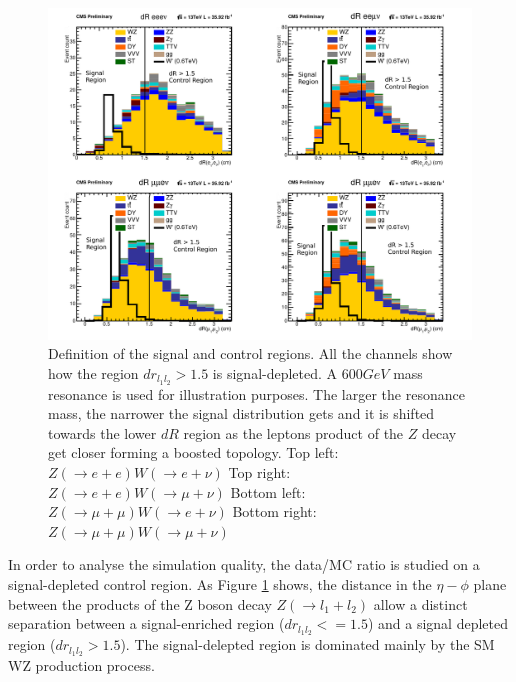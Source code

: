 \begin{figure}[tph]
  \centering
  \includegraphics[width=\textwidth]{fig/Run2/KFactorIncluded_HDistl1l2_CR1_A+HDisM600.pdf}
  \caption{Definition of the signal and control regions. All the channels
    show how the region $dr_{l_{1}l_{2}} > 1.5$ is signal-depleted. A $600 GeV$
    mass resonance is used for illustration purposes. The larger the resonance
    mass, the narrower the signal distribution gets and it is shifted towards
    the lower $dR$ region as the leptons product of the $Z$ decay get closer
    forming a boosted topology.
    Top left: $Z(\rightarrow e+e)W(\rightarrow e+\nu)$
    Top right: $Z(\rightarrow e+e)W(\rightarrow \mu+\nu)$
    Bottom left: $Z(\rightarrow \mu+\mu)W(\rightarrow e+\nu)$
    Bottom right: $Z(\rightarrow \mu+\mu)W(\rightarrow \mu+\nu)$}
  \label{fig:ControlRegionDefinition}
\end{figure}

In order to analyse the simulation quality, the data/MC ratio is studied on
a signal-depleted control region. As Figure \ref{fig:ControlRegionDefinition}
shows, the distance in the $\eta-\phi$ plane between the products
of the Z boson decay $Z(\rightarrow l_{1}+l_{2})$ allow a distinct separation between a signal-enriched
region ($dr_{l_{1}l_{2}} <= 1.5$) and a signal depleted region
($dr_{l_{1}l_{2}} > 1.5$). The signal-delepted region is dominated mainly by
the SM WZ production process.

